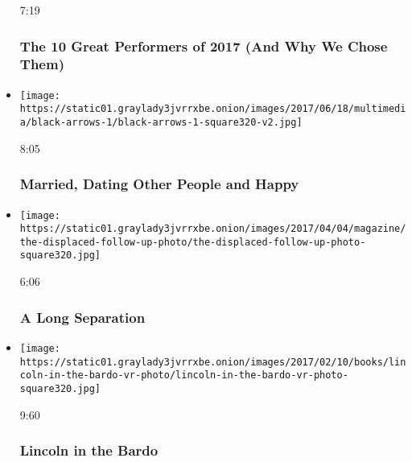 \begin{itemize}
  7:19

  \hypertarget{the-10-great-performers-of-2017-and-why-we-chose-them}{%
  \subsubsection{The 10 Great Performers of 2017 (And Why We Chose
  Them)}\label{the-10-great-performers-of-2017-and-why-we-chose-them}}
\item
  \href{https://www.nytimes3xbfgragh.onion/video/magazine/100000005087630/open-marriages-non-monogamy.html?action=click\&module=video-series-bar\&region=header\&pgtype=Article\&playlistId=video/magazine}{}

  \texttt{[image: https://static01.graylady3jvrrxbe.onion/images/2017/06/18/multimedia/black-arrows-1/black-arrows-1-square320-v2.jpg]}

  8:05

  \hypertarget{married-dating-other-people-and-happy}{%
  \subsubsection{Married, Dating Other People and
  Happy}\label{married-dating-other-people-and-happy}}
\item
  \href{https://www.nytimes3xbfgragh.onion/video/magazine/100000005013826/lynsey-addario-south-sudan-refugee.html?action=click\&module=video-series-bar\&region=header\&pgtype=Article\&playlistId=video/magazine}{}

  \texttt{[image: https://static01.graylady3jvrrxbe.onion/images/2017/04/04/magazine/the-displaced-follow-up-photo/the-displaced-follow-up-photo-square320.jpg]}

  6:06

  \hypertarget{a-long-separation}{%
  \subsubsection{A Long Separation}\label{a-long-separation}}
\item
  \href{https://www.nytimes3xbfgragh.onion/video/magazine/100000004919906/lincoln-in-the-bardo.html?action=click\&module=video-series-bar\&region=header\&pgtype=Article\&playlistId=video/magazine}{}

  \texttt{[image: https://static01.graylady3jvrrxbe.onion/images/2017/02/10/books/lincoln-in-the-bardo-vr-photo/lincoln-in-the-bardo-vr-photo-square320.jpg]}

  9:60

  \hypertarget{lincoln-in-the-bardo}{%
  \subsubsection{Lincoln in the Bardo}\label{lincoln-in-the-bardo}}
\end{itemize}

